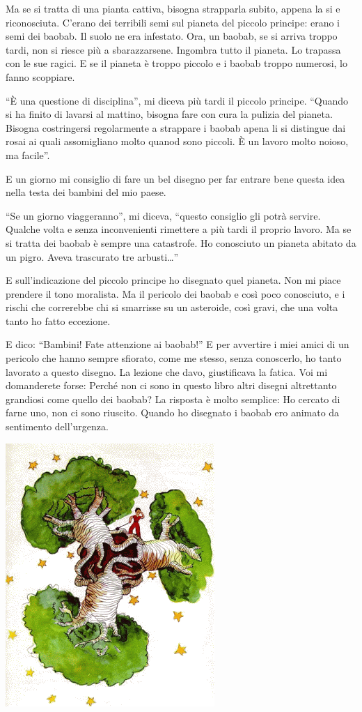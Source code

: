 \documentclass[11pt]{scrbook}
\begin{document}
Ma se si tratta di una pianta cattiva, bisogna strapparla subito, appena
la si e riconosciuta. C'erano dei terribili semi sul pianeta del piccolo
principe: erano i semi dei baobab. Il suolo ne era infestato. Ora, un
baobab, se si arriva troppo tardi, non si riesce più a sbarazzarsene.
Ingombra tutto il pianeta. Lo trapassa con le sue ragici. E se il
pianeta è troppo piccolo e i baobab troppo numerosi, lo fanno scoppiare.

``È una questione di disciplina'', mi diceva più tardi il piccolo
principe. ``Quando si ha finito di lavarsi al mattino, bisogna fare con
cura la pulizia del pianeta. Bisogna costringersi regolarmente a
strappare i baobab apena li si distingue dai rosai ai quali assomigliano
molto quanod sono piccoli. È un lavoro molto noioso, ma facile''.

E un giorno mi consiglio di fare un bel disegno per far entrare bene
questa idea nella testa dei bambini del mio paese.

``Se un giorno viaggeranno'', mi diceva, ``questo consiglio gli potrà
servire. Qualche volta e senza inconvenienti rimettere a più tardi il
proprio lavoro. Ma se si tratta dei baobab è sempre una catastrofe. Ho
conosciuto un pianeta abitato da un pigro. Aveva trascurato tre
arbusti\ldots{}''

E sull'indicazione del piccolo principe ho disegnato quel pianeta. Non
mi piace prendere il tono moralista. Ma il pericolo dei baobab e così
poco conosciuto, e i rischi che correrebbe chi si smarrisse su un
asteroide, così gravi, che una volta tanto ho fatto eccezione.

E dico: ``Bambini! Fate attenzione ai baobab!'' E per avvertire i miei
amici di un pericolo che hanno sempre sfiorato, come me stesso, senza
conoscerlo, ho tanto lavorato a questo disegno. La lezione che davo,
giustificava la fatica. Voi mi domanderete forse: Perché non ci sono in
questo libro altri disegni altrettanto grandiosi come quello dei baobab?
La risposta è molto semplice: Ho cercato di farne uno, non ci sono
riuscito. Quando ho disegnato i baobab ero animato da sentimento
dell'urgenza.

\begin{center}
\includegraphics{img/baobaby}
\end{center}
\end{document}
